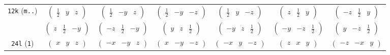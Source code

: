 \documentclass[fleqn,9pt,landscape]{jsarticle}
\begin{document}
\begin{center}
\begin{longtable}{ccccccc}
{\tt 12k} ({\tt m..}) & $ \begin{pmatrix} \frac{1}{2} & y & z \end{pmatrix} $ & $ \begin{pmatrix} \frac{1}{2} & - y & z \end{pmatrix} $ & $ \begin{pmatrix} \frac{1}{2} & - y & - z \end{pmatrix} $ & $ \begin{pmatrix} \frac{1}{2} & y & - z \end{pmatrix} $ & $ \begin{pmatrix} z & \frac{1}{2} & y \end{pmatrix} $ & $ \begin{pmatrix} - z & \frac{1}{2} & y \end{pmatrix} $ \\
& $ \begin{pmatrix} z & \frac{1}{2} & - y \end{pmatrix} $ & $ \begin{pmatrix} - z & \frac{1}{2} & - y \end{pmatrix} $ & $ \begin{pmatrix} y & z & \frac{1}{2} \end{pmatrix} $ & $ \begin{pmatrix} - y & z & \frac{1}{2} \end{pmatrix} $ & $ \begin{pmatrix} - y & - z & \frac{1}{2} \end{pmatrix} $ & $ \begin{pmatrix} y & - z & \frac{1}{2} \end{pmatrix} $ \\ \hline
{\tt 24l} ({\tt 1}) & $ \begin{pmatrix} x & y & z \end{pmatrix} $ & $ \begin{pmatrix} - x & - y & z \end{pmatrix} $ & $ \begin{pmatrix} x & - y & - z \end{pmatrix} $ & $ \begin{pmatrix} - x & y & - z \end{pmatrix} $ & $ \begin{pmatrix} z & x & y \end{pmatrix} $ & $ \begin{pmatrix} - z & - x & y \end{pmatrix} $ \\

\end{longtable}
\end{center}
\end{document}
